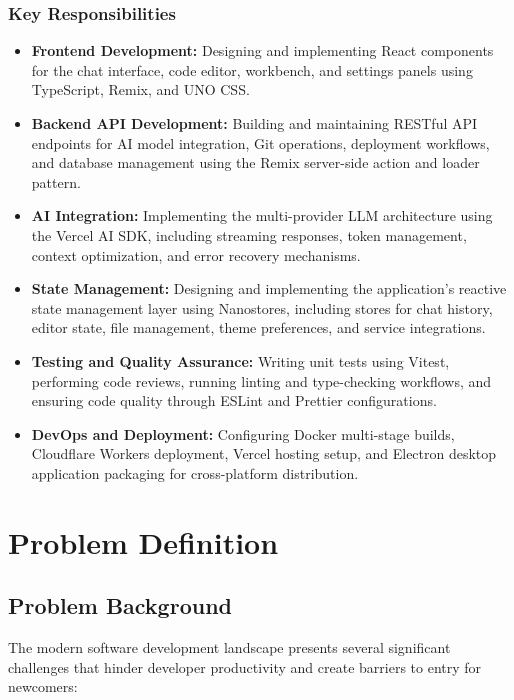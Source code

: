 \documentclass[12pt,a4paper,openany]{report}
\begin{document}
\subsection{Key Responsibilities}
\begin{itemize}
    \item \textbf{Frontend Development:} Designing and implementing React components for the chat interface, code editor, workbench, and settings panels using TypeScript, Remix, and UNO CSS.
    \item \textbf{Backend API Development:} Building and maintaining RESTful API endpoints for AI model integration, Git operations, deployment workflows, and database management using the Remix server-side action and loader pattern.
    \item \textbf{AI Integration:} Implementing the multi-provider LLM architecture using the Vercel AI SDK, including streaming responses, token management, context optimization, and error recovery mechanisms.
    \item \textbf{State Management:} Designing and implementing the application's reactive state management layer using Nanostores, including stores for chat history, editor state, file management, theme preferences, and service integrations.
    \item \textbf{Testing and Quality Assurance:} Writing unit tests using Vitest, performing code reviews, running linting and type-checking workflows, and ensuring code quality through ESLint and Prettier configurations.
    \item \textbf{DevOps and Deployment:} Configuring Docker multi-stage builds, Cloudflare Workers deployment, Vercel hosting setup, and Electron desktop application packaging for cross-platform distribution.
\end{itemize}

\chapter{Problem Definition}

\section{Problem Background}

The modern software development landscape presents several significant challenges that hinder developer productivity and create barriers to entry for newcomers:
\end{document}
